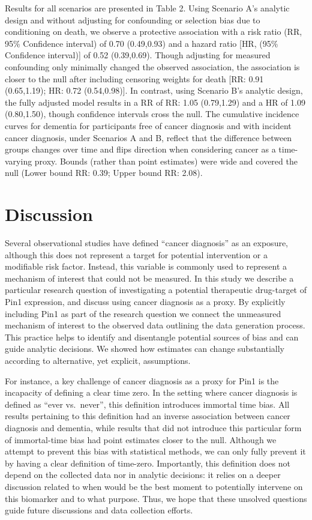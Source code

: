 \documentclass[
]{book}
\begin{document}
Results for all scenarios are presented in Table 2. Using Scenario A's analytic design and without adjusting for confounding or selection bias due to conditioning on death, we observe a protective association with a risk ratio (RR, 95\% Confidence interval) of 0.70 (0.49,0.93) and a hazard ratio {[}HR, (95\% Confidence interval){]} of 0.52 (0.39,0.69). Though adjusting for measured confounding only minimally changed the observed association, the association is closer to the null after including censoring weights for death {[}RR: 0.91 (0.65,1.19); HR: 0.72 (0.54,0.98){]}. In contrast, using Scenario B's analytic design, the fully adjusted model results in a RR of RR: 1.05 (0.79,1.29) and a HR of 1.09 (0.80,1.50), though confidence intervals cross the null. The cumulative incidence curves for dementia for participants free of cancer diagnosis and with incident cancer diagnosis, under Scenarios A and B, reflect that the difference between groups changes over time and flips direction when considering cancer as a time-varying proxy. Bounds (rather than point estimates) were wide and covered the null (Lower bound RR: 0.39; Upper bound RR: 2.08).

\hypertarget{discussion-1}{%
\section{Discussion}\label{discussion-1}}

Several observational studies have defined ``cancer diagnosis'' as an exposure, although this does not represent a target for potential intervention or a modifiable risk factor. Instead, this variable is commonly used to represent a mechanism of interest that could not be measured. In this study we describe a particular research question of investigating a potential therapeutic drug-target of Pin1 expression, and discuss using cancer diagnosis as a proxy. By explicitly including Pin1 as part of the research question we connect the unmeasured mechanism of interest to the observed data outlining the data generation process. This practice helps to identify and disentangle potential sources of bias and can guide analytic decisions. We showed how estimates can change substantially according to alternative, yet explicit, assumptions.

For instance, a key challenge of cancer diagnosis as a proxy for Pin1 is the incapacity of defining a clear time zero\autocite{hernanInmortal2016}. In the setting where cancer diagnosis is defined as ``ever vs.~never'', this definition introduces immortal time bias. All results pertaining to this definition had an inverse association between cancer diagnosis and dementia, while results that did not introduce this particular form of immortal-time bias had point estimates closer to the null. Although we attempt to prevent this bias with statistical methods, we can only fully prevent it by having a clear definition of time-zero. Importantly, this definition does not depend on the collected data nor in analytic decisions: it relies on a deeper discussion related to when would be the best moment to potentially intervene on this biomarker and to what purpose. Thus, we hope that these unsolved questions guide future discussions and data collection efforts.
\end{document}
